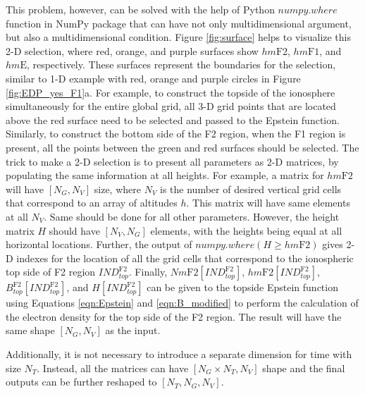 \documentclass[draft]{agujournal2019}
\begin{document}
This problem, however, can be solved with the help of Python $numpy.where$ function in NumPy package that can have not only multidimensional argument, but also a multidimensional condition. Figure \ref{fig:surface} helps to visualize this 2-D selection, where red, orange, and purple surfaces show $hm\mathrm{F2}$, $hm\mathrm{F1}$, and $hm\mathrm{E}$, respectively. These surfaces represent the boundaries for the selection, similar to 1-D example with red, orange and purple circles in Figure \ref{fig:EDP_yes_F1}a. For example, to construct the topside of the ionosphere simultaneously for the entire global grid, all 3-D grid points that are located above the red surface need to be selected and passed to the Epstein function. Similarly, to construct the bottom side of the F2 region, when the F1 region is present, all the points between the green and red surfaces should be selected. 
The trick to make a 2-D selection is to present all parameters as 2-D matrices, by populating the same information at all heights. For example, a matrix for $hm\mathrm{F2}$ will have $[N_G, N_V]$ size, where $N_V$ is the number of desired vertical grid cells that correspond to an array of altitudes $h$. This matrix will have same elements at all $N_V$. Same should be done for all other parameters. However, the height matrix $H$ should have $[N_V, N_G]$ elements, with the heights being equal at all horizontal locations. Further, the output of $numpy.where(H \ge hm\mathrm{F2})$ gives 2-D indexes for the location of all the grid cells that correspond to the ionospheric top side of F2 region $IND_{top}^{\mathrm{F2}}$. Finally, $Nm\mathrm{F2}[IND_{top}^{\mathrm{F2}}]$, $hm\mathrm{F2}[IND_{top}^{\mathrm{F2}}]$, $B^{\mathrm{F2}}_{top}[IND_{top}^{\mathrm{F2}}]$, and $H[IND_{top}^{\mathrm{F2}}]$ can be given to the topside Epstein function using Equations \ref{eqn:Epstein} and \ref{eqn:B_modified} to perform the calculation of the electron density for the top side of the F2 region. The result will have the same shape $[N_G, N_V]$ as the input.

Additionally, it is not necessary to introduce a separate dimension for time with size $N_T$. Instead, all the matrices can have $[N_G\times N_T, N_V]$ shape and the final outputs can be further reshaped to $[N_T, N_G, N_V]$. 
\end{document}

